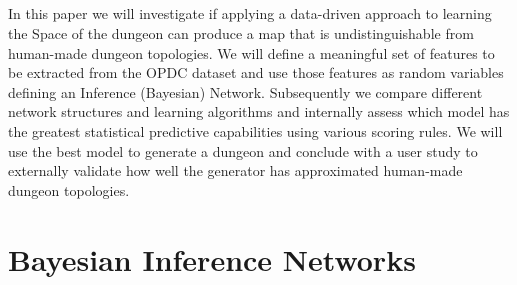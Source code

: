 \documentclass{UoYCSproject}
\begin{document}
\paragraph{} %
In this paper we will investigate if applying a data-driven approach to learning the Space of the dungeon can produce a map that is undistinguishable from human-made dungeon topologies. We will define a meaningful set of features to be extracted from the OPDC dataset and use those features as random variables defining an Inference (Bayesian) Network. Subsequently we compare different network structures and learning algorithms and internally assess which model has the greatest statistical predictive capabilities using various scoring rules. We will use the best model to generate a dungeon and conclude with a user study to externally validate how well the generator has approximated human-made dungeon topologies. %


\chapter{Bayesian Inference Networks}
\end{document}
